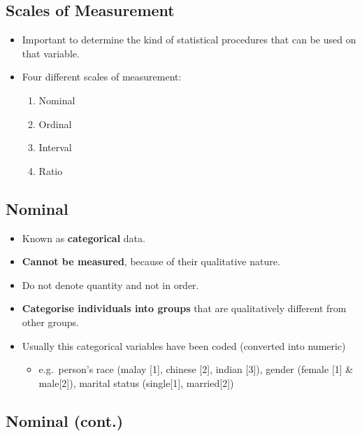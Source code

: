 \documentclass[]{article}
\providecommand{\tightlist}{%
  \setlength{\itemsep}{0pt}\setlength{\parskip}{0pt}}
\begin{document}
\hypertarget{scales-of-measurement}{%
\subsection{Scales of Measurement}\label{scales-of-measurement}}

\begin{itemize}
\item
  Important to determine the kind of statistical procedures that can be
  used on that variable.
\item
  Four different scales of measurement:

  \begin{enumerate}
  \def\labelenumi{\arabic{enumi}.}
  \tightlist
  \item
    Nominal
  \item
    Ordinal
  \item
    Interval
  \item
    Ratio
  \end{enumerate}
\end{itemize}

\hypertarget{nominal}{%
\subsection{Nominal}\label{nominal}}

\begin{itemize}
\tightlist
\item
  Known as {\textbf{categorical}} data.
\item
  {\textbf{Cannot be measured}}, because of their qualitative nature.
\item
  Do not denote quantity and not in order.
\item
  {\textbf{Categorise individuals into groups}} that are qualitatively
  different from other groups.
\item
  Usually this categorical variables have been coded (converted into
  numeric)

  \begin{itemize}
  \tightlist
  \item
    e.g.~person's race (malay {[}1{]}, chinese {[}2{]}, indian {[}3{]}),
    gender (female {[}1{]} \& male{[}2{]}), marital status
    (single{[}1{]}, married{[}2{]})
  \end{itemize}
\end{itemize}

\hypertarget{nominal-cont.}{%
\subsection{Nominal (cont.)}\label{nominal-cont.}}
\end{document}
